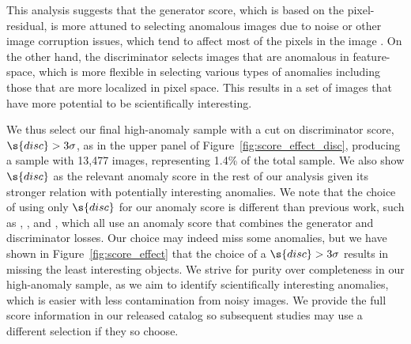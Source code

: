 This analysis suggests that the generator score, which is based on the pixel-residual, is more attuned to selecting anomalous images due to noise or other image corruption issues, which tend to affect most of the pixels in the image .
On the other hand, the discriminator selects images that are anomalous in feature-space, which is more flexible in selecting various types of anomalies including those that are more localized in pixel space.
This results in a set of images that have more potential to be scientifically interesting.


We thus select our final high-anomaly sample with a cut on discriminator score, $\s{disc}>3\sigma$, as in the upper panel of Figure~\ref{fig:score_effect_disc}, producing a sample with 13,477 images, representing 1.4\% of the total sample. 
We also show $\s{disc}$ as the relevant anomaly score in the rest of our analysis given its stronger relation with potentially interesting anomalies.
We note that the choice of using only $\s{disc}$ for our anomaly score is different than previous work, such as \cite{Schlegl2017}, \cite{Zenati2018a}, and \cite{Margalef-Bentabol2020}, which all use an anomaly score that combines the generator and discriminator losses.
Our choice may indeed miss some anomalies, but we have shown in Figure~\ref{fig:score_effect} that the choice of a $\s{disc}>3\sigma$ results in missing the least interesting objects.
We strive for purity over completeness in our high-anomaly sample, as we aim to identify scientifically interesting anomalies, which is easier with less contamination from noisy images.
We provide the full score information in our released catalog so subsequent studies may use a different selection if they so choose.



